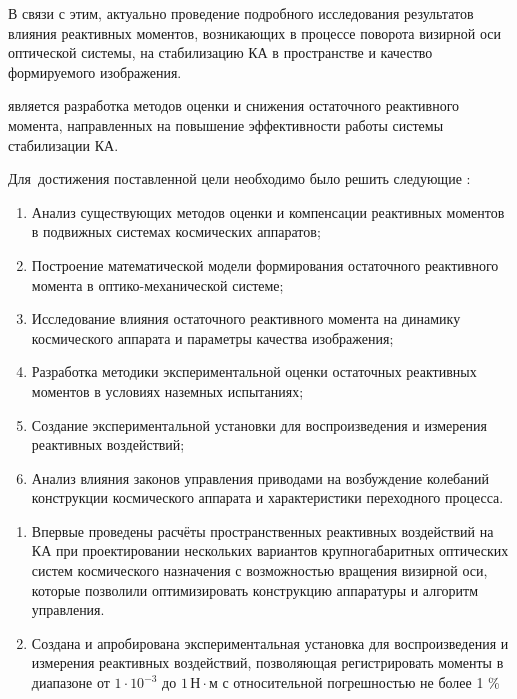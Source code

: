 В связи с этим, актуально проведение подробного исследования результатов влияния реактивных моментов, возникающих в процессе поворота визирной оси оптической системы, на стабилизацию КА в пространстве и качество формируемого изображения.



{\aim}  является разработка методов оценки и снижения остаточного реактивного момента, направленных на повышение эффективности работы системы стабилизации КА.

Для~достижения поставленной цели необходимо было решить следующие {\tasks}:
\begin{enumerate}[beginpenalty=10000] %
  \item Анализ существующих методов оценки и компенсации реактивных моментов в подвижных системах космических аппаратов;
  \item Построение математической модели формирования остаточного реактивного момента в оптико-механической системе;
  \item Исследование влияния остаточного реактивного момента на динамику космического аппарата и параметры качества изображения;
  \item Разработка методики экспериментальной оценки остаточных реактивных моментов в условиях наземных испытаниях;
  \item Создание экспериментальной установки для воспроизведения и измерения реактивных воздействий;
  \item Анализ влияния законов управления приводами на возбуждение колебаний конструкции космического аппарата и характеристики переходного процесса.
\end{enumerate}


{\novelty}
\begin{enumerate}[beginpenalty=10000] %
  \item Впервые проведены расчёты пространственных реактивных воздействий на КА при проектировании нескольких вариантов крупногабаритных оптических систем космического назначения с возможностью вращения визирной оси, которые позволили оптимизировать конструкцию аппаратуры и алгоритм управления.
  \item Создана и апробирована экспериментальная установка для воспроизведения и измерения реактивных воздействий, позволяющая регистрировать моменты в диапазоне от $1 \cdot 10^{-3}$ до $1\,\text{Н}\cdot\text{м}$ с относительной погрешностью не более 1 \%
\end{enumerate}

